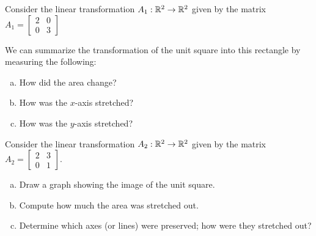
\begin{applicationActivities}{1}{25}

\begin{observation}
Consider the linear transformation $A_1 : \mathbb{R}^2 \rightarrow \mathbb{R}^2$ given by the matrix $A_1 = \begin{bmatrix} 2 & 0 \\ 0 & 3 \end{bmatrix}$

\begin{center}
\end{center}

We can summarize the transformation of the unit square into this rectangle by measuring the following:

\begin{enumerate}[(a)]
\item How did the area change?
\item How was the $x$-axis stretched?
\item How was the $y$-axis stretched?
\end{enumerate}

\end{observation}


\begin{activity}{10}
Consider the linear transformation  $A_2: \mathbb{R}^2 \rightarrow \mathbb{R}^2$ given by the matrix
$A_2 = \begin{bmatrix} 2 & 3 \\ 0 & 1 \end{bmatrix}$.

\begin{enumerate}[(a)]
\item Draw a graph showing the image of the unit square.
\item Compute how much the area was stretched out.
\item Determine which axes (or lines) were preserved; how were they stretched out?
\end{enumerate}
\end{activity}


\end{applicationActivities}
